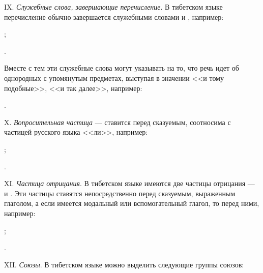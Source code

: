 IX. \emph{Служебные слова, завершающие перечисление}. В тибетском языке перечисление обычно завершается служебными словами  и , например:
\begin{prfsample}
	\item {};
	\item {}.
\end{prfsample}
Вместе с тем эти служебные слова могут указывать на то, что речь идет об однородных с упомянутым предметах, выступая в значении <<и тому подобные>>, <<и так далее>>, например:
\begin{prfsample}
	\item {}.
\end{prfsample}

X. \emph{Вопросительная частица}  --- ставится перед сказуемым, соотносима с частицей русского языка <<ли>>, например:
\begin{prfsample}
	\item {};
	\item {}.
\end{prfsample}

XI. \emph{Частица отрицания}. В тибетском языке имеются две частицы отрицания ---  и . Эти частицы ставятся непосредственно перед сказуемым, выраженным глаголом, а если имеется модальный или вспомогательный глагол, то перед ними, например:
\begin{prfsample}
	\item {};
	\item {}.
\end{prfsample}

XII. \emph{Союзы}. В тибетском языке можно выделить следующие группы союзов:

